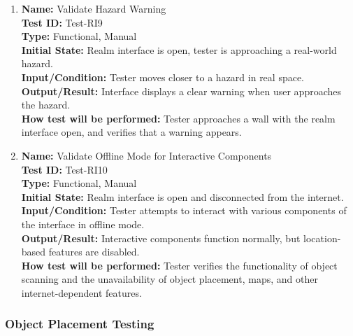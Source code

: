 \documentclass[12pt, titlepage]{article}
\begin{document}
\begin{enumerate}
  \item \textbf{Name:} Validate Hazard Warning \label{itm:Test-RI9} \\
        \textbf{Test ID:} Test-RI9 \\
        \textbf{Type:} Functional, Manual \\
        \textbf{Initial State:} Realm interface is open, tester is approaching a real-world hazard. \\
        \textbf{Input/Condition:} Tester moves closer to a hazard in real space. \\
        \textbf{Output/Result:} Interface displays a clear warning when user approaches the hazard. \\
        \textbf{How test will be performed:} Tester approaches a wall with the realm interface open, and verifies that a warning appears.

  \item \textbf{Name:} Validate Offline Mode for Interactive Components \label{itm:Test-RI10} \\
        \textbf{Test ID:} Test-RI10 \\
        \textbf{Type:} Functional, Manual \\
        \textbf{Initial State:} Realm interface is open and disconnected from the internet. \\
        \textbf{Input/Condition:} Tester attempts to interact with various components of the interface in offline mode. \\
        \textbf{Output/Result:} Interactive components function normally, but location-based features are disabled. \\
        \textbf{How test will be performed:} Tester verifies the functionality of object scanning and the unavailability of object placement, maps, and other internet-dependent features.

\end{enumerate}

\subsubsection{Object Placement Testing}
\end{document}
